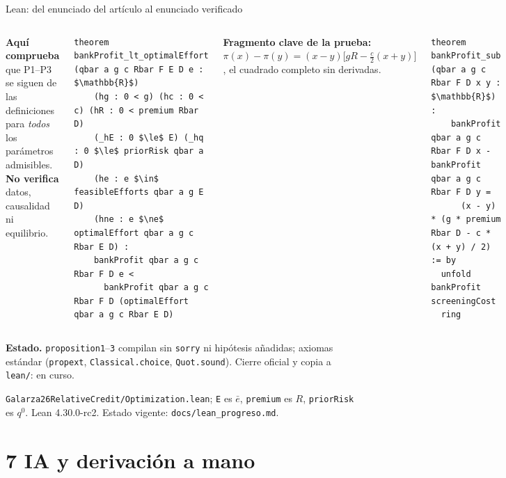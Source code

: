 \documentclass[aspectratio=169,10pt,t]{beamer}
\newcommand{\source}[1]{\par\vfill{\fontsize{6}{7.2}\selectfont\color{soft}#1\par}}
\newcommand{\qz}{q^{0}}
\newcommand{\eb}{\bar e}
\begin{document}
\begin{frame}[fragile]{Lean: del enunciado del artículo al enunciado verificado}
\begin{columns}[T,onlytextwidth]
\begin{plainbox}
\vspace{.5mm}
\textbf{Aquí comprueba} que P1--P3 se siguen de las definiciones para \emph{todos}
los parámetros admisibles. \textbf{No verifica} datos, causalidad ni equilibrio.
\end{plainbox}
\begin{plainbox}
\begin{lstlisting}
theorem bankProfit_lt_optimalEffort (qbar a g c Rbar F E D e : $\mathbb{R}$)
    (hg : 0 < g) (hc : 0 < c) (hR : 0 < premium Rbar D)
    (_hE : 0 $\le$ E) (_hq : 0 $\le$ priorRisk qbar a D)
    (he : e $\in$ feasibleEfforts qbar a g E D)
    (hne : e $\ne$ optimalEffort qbar a g c Rbar E D) :
    bankProfit qbar a g c Rbar F D e <
      bankProfit qbar a g c Rbar F D (optimalEffort qbar a g c Rbar E D)
\end{lstlisting}
\end{plainbox}
\vspace{-1.2mm}
{\footnotesize\textbf{Fragmento clave de la prueba:}
$\pi(x)-\pi(y)=(x-y)\bigl[gR-\tfrac{c}{2}(x+y)\bigr]$, el cuadrado completo sin
derivadas.\par}
\vspace{-.6mm}
\begin{plainbox}
\begin{lstlisting}
theorem bankProfit_sub (qbar a g c Rbar F D x y : $\mathbb{R}$) :
    bankProfit qbar a g c Rbar F D x - bankProfit qbar a g c Rbar F D y =
      (x - y) * (g * premium Rbar D - c * (x + y) / 2) := by
  unfold bankProfit screeningCost
  ring
\end{lstlisting}
\end{plainbox}
\end{columns}
\vspace{-.5mm}
{\footnotesize\textbf{Estado.} \texttt{proposition1}--\texttt{3} compilan sin
\texttt{sorry} ni hipótesis añadidas; axiomas estándar (\texttt{propext},
\texttt{Classical.choice}, \texttt{Quot.sound}). Cierre oficial y copia a
\texttt{lean/}: en curso.\par}
\source{\texttt{Galarza26RelativeCredit/Optimization.lean}; \texttt{E} es $\eb$,
\texttt{premium} es $R$, \texttt{priorRisk} es $\qz$. Lean 4.30.0-rc2. Estado
vigente: \texttt{docs/lean\_progreso.md}.}
\end{frame}

\section{7 IA y derivación a mano}
\end{document}
